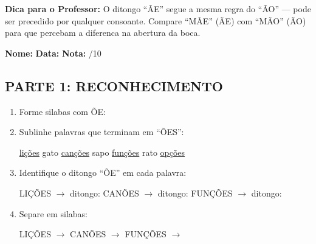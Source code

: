 \begin{dica}
\textbf{Dica para o Professor:} O ditongo ``ÃE'' segue a mesma regra do ``ÃO'' --- pode ser precedido por qualquer consoante. Compare ``MÃE'' (ÃE) com ``MÃO'' (ÃO) para que percebam a diferenca na abertura da boca.
\end{dica}

\begin{exercicio}
\noindent\textbf{Nome:} \underline{\hspace{3.2cm}} \quad \textbf{Data:} \underline{\hspace{1.6cm}} \quad \textbf{Nota:} \underline{\hspace{0.9cm}}/10

\subsection*{PARTE 1: RECONHECIMENTO}

\begin{enumerate}
  \item Forme silabas com ÕE:
  \begin{center}
  \end{center}

  \item Sublinhe palavras que terminam em ``ÕES'':
  \begin{center}
  \uline{lições} \quad gato \quad \uline{canções} \quad sapo \quad \uline{funções} \quad rato \quad \uline{opções}
  \end{center}

  \item Identifique o ditongo ``ÕE'' em cada palavra:
  \begin{center}
  LIÇÕES $\rightarrow$ ditongo: \underline{\hspace{1cm}} \quad CANÕES $\rightarrow$ ditongo: \underline{\hspace{1cm}} \quad FUNÇÕES $\rightarrow$ ditongo: \underline{\hspace{1cm}}
  \end{center}

  \item Separe em silabas:
  \begin{center}
  LIÇÕES $\rightarrow$ \underline{\hspace{1cm}} \underline{\hspace{1cm}} \underline{\hspace{1cm}} \quad CANÕES $\rightarrow$ \underline{\hspace{1cm}} \underline{\hspace{1cm}} \underline{\hspace{1cm}} \quad FUNÇÕES $\rightarrow$ \underline{\hspace{1cm}} \underline{\hspace{1cm}} \underline{\hspace{1cm}}
  \end{center}


\end{enumerate}
\end{exercicio}
